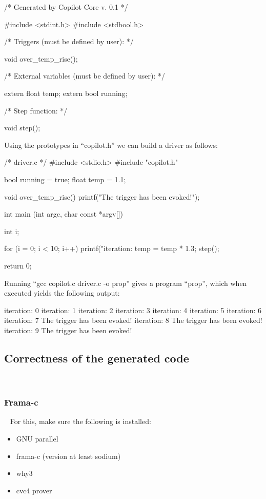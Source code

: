 \begin{code}
/* Generated by Copilot Core v. 0.1 */

#include <stdint.h>
#include <stdbool.h>

/* Triggers (must be defined by user): */

void over_temp_rise();

/* External variables (must be defined by user): */

extern float temp;
extern bool running;

/* Step function: */

void step();
\end{code}

Using the prototypes in ``copilot.h'' we can build a driver as follows:

\begin{code}
/* driver.c */
#include <stdio.h>
#include "copilot.h"

bool running = true;
float temp = 1.1;

void over_temp_rise()
{
  printf("The trigger has been evoked!\n");
}

int main (int argc, char const *argv[])
{
  int i;

  for (i = 0; i < 10; i++)
  {
    printf("iteration: %
    temp = temp * 1.3;
    step();
  }

  return 0;
}
\end{code}

Running ``gcc copilot.c driver.c -o prop'' gives a program ``prop'', which when executed
yields the following output:
%
\begin{code}
iteration: 0
iteration: 1
iteration: 2
iteration: 3
iteration: 4
iteration: 5
iteration: 6
iteration: 7
The trigger has been evoked!
iteration: 8
The trigger has been evoked!
iteration: 9
The trigger has been evoked!
\end{code}
%

\subsection{Correctness of the generated code}~\label{sec:correctness} 

\subsubsection{Frama-c}~\label{subsec:frama-c} 
For this, make sure the following is installed:

\begin{itemize}
	\item GNU parallel
	\item frama-c (version at least sodium)
	\item why3 
	\item cvc4 prover
\end{itemize}

